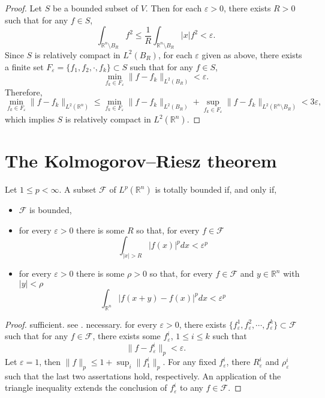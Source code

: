 \begin{proof}
	Let $S$ be a bounded subset of $V$.
	Then for each $\varepsilon>0$, there exists $R>0$ such that 
	for any $f\in S$,
	\[
	\int_{\mathbb{R}^n\setminus B_R}f^2 \leq \frac1R\int_{\mathbb{R}^n\setminus B_R}|x|f^2<\varepsilon.
	\]
	Since $S$ is relatively compact in $L^2(B_R)$, 
	for each $\varepsilon$ given as above,
	there exists a finite set $F_\varepsilon = \{f_1, f_2, \cdot, f_k\}\subset S$ such that 
	for any $f\in S$, 
	\[
	\min_{f_k\in F_\varepsilon}\|f-f_k\|_{L^2(B_R)}< \varepsilon.
	\] 
	Therefore,
	\[
	\min_{f_k\in F_\varepsilon}\|f-f_k\|_{L^{2}(\mathbb R^n)}
	\leq \min_{f_k\in F_\varepsilon}\|f-f_k\|_{L^{2}(B_R)}
		+ \sup_{f_k\in F_\varepsilon}\|f-f_k\|_{L^{2}(\mathbb R^n\setminus B_R)} 
		< 3\varepsilon,
	\]
	which implies $S$ is relatively compact in $L^2(\mathbb R^n)$.
\end{proof}

\section{The Kolmogorov–Riesz theorem}
\begin{theorem}
	 Let $1 \leq p<\infty .$ A subset $\mathcal{F}$ of $L^{p}\left(\mathbb{R}^{n}\right)$ is totally bounded if, and only if,
	 \begin{itemize}
	 	\item $\mathcal{F}$ is bounded,
	 	\item for every $\varepsilon>0$ there is some $R$ so that, for every $f \in \mathcal{F}$
	 	$$
	 	\int_{|x|>R}|f(x)|^{p} d x<\varepsilon^{p}
	 	$$
	 	\item for every $\varepsilon>0$ there is some $\rho>0$ so that, for every $f \in \mathcal{F}$ and $y \in \mathbb{R}^{n}$ with $|y|<\rho$
	 	$$
	 	\int_{\mathbb{R}^{n}}|f(x+y)-f(x)|^{p} d x<\varepsilon^{p}
	 	$$	
	 \end{itemize}
\end{theorem}

\begin{proof}
	sufficient. 
	see \cite{Hanche-Olsen2010}.
	necessary.
	for every $\varepsilon>0$, 
	there exists $\{f_\varepsilon^1, f_\varepsilon^2, \cdots, f_\varepsilon^k\}\subset\mathcal{F}$ such that 
	for any $f\in\mathcal{F}$, 
	there exists some $f_\varepsilon^i$, $1\leq i \leq k$ such that 
	\[
	\|f-f_\varepsilon^i\|_p < \varepsilon.
	\]
	Let $\varepsilon=1$, then $\|f\|_p\leq1+\sup_i\|f_1^i\|_p$.
	For any fixed $f_\varepsilon^i$, there $R_\varepsilon^i$ and $\rho_\varepsilon^i$ such that the last two assertations hold, respectively. An application of the triangle inequality extends the conclusion of $f_\varepsilon^i$ to any $f\in\mathcal{F}$.
\end{proof}

